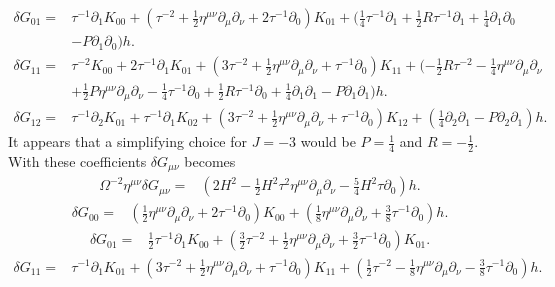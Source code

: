 \documentclass[10pt,letterpaper]{article}
\begin{document}
\begin{align}
\delta G_{01}={}&\tau^{-1} \partial_{1} K_{00}
 + (\tau^{-2}
 + \tfrac{1}{2} \eta^{\mu \nu} \partial_{\mu} \partial_{\nu}
 + 2 \tau^{-1} \partial_{0}) K_{01}
 + (\tfrac{1}{4} \tau^{-1} \partial_{1}
 + \tfrac{1}{2} R \tau^{-1} \partial_{1}
 + \tfrac{1}{4} \partial_{1} \partial_{0}\nonumber\\
& -  P \partial_{1} \partial_{0}) h.
\end{align}
\begin{align}
\delta G_{11}={}&\tau^{-2} K_{00}
 + 2 \tau^{-1} \partial_{1} K_{01}
 + (3 \tau^{-2}
 + \tfrac{1}{2} \eta^{\mu \nu} \partial_{\mu} \partial_{\nu}
 + \tau^{-1} \partial_{0}) K_{11}
 + (- \tfrac{1}{2} R \tau^{-2}
 -  \tfrac{1}{4} \eta^{\mu \nu} \partial_{\mu} \partial_{\nu}\nonumber\\
& + \tfrac{1}{2} P \eta^{\mu \nu} \partial_{\mu} \partial_{\nu}
 -  \tfrac{1}{4} \tau^{-1} \partial_{0}
 + \tfrac{1}{2} R \tau^{-1} \partial_{0}
 + \tfrac{1}{4} \partial_{1} \partial_{1}
 -  P \partial_{1} \partial_{1}) h.
\end{align}
\begin{align}
\delta G_{12}={}&\tau^{-1} \partial_{2} K_{01}
 + \tau^{-1} \partial_{1} K_{02}
 + (3 \tau^{-2}
 + \tfrac{1}{2} \eta^{\mu \nu} \partial_{\mu} \partial_{\nu}
 + \tau^{-1} \partial_{0}) K_{12}
 + (\tfrac{1}{4} \partial_{2} \partial_{1}
 -  P \partial_{2} \partial_{1}) h.
\end{align}
It appears that a simplifying choice for $J=-3$ would be $P=\tfrac14$ and $R=-\tfrac12$. 
With these coefficients $\delta G_{\mu\nu}$ becomes
\begin{align}
\Omega^{-2}\eta^{\mu\nu}\delta G_{\mu\nu}={}&(2 H^2
 -  \tfrac{1}{2} H^2 \tau^2 \eta^{\mu \nu} \partial_{\mu} \partial_{\nu}
 -  \tfrac{5}{4} H^2 \tau \partial_{0}) h.
\end{align}
\begin{align}
\delta G_{00}={}&(\tfrac{1}{2} \eta^{\mu \nu} \partial_{\mu} \partial_{\nu}
 + 2 \tau^{-1} \partial_{0}) K_{00}
 + (\tfrac{1}{8} \eta^{\mu \nu} \partial_{\mu} \partial_{\nu}
 + \tfrac{3}{8} \tau^{-1} \partial_{0}) h.
\end{align}
\begin{align}
\delta G_{01}={}&\tfrac{1}{2} \tau^{-1} \partial_{1} K_{00}
 + (\tfrac{3}{2} \tau^{-2}
 + \tfrac{1}{2} \eta^{\mu \nu} \partial_{\mu} \partial_{\nu}
 + \tfrac{3}{2} \tau^{-1} \partial_{0}) K_{01}.
\end{align}
\begin{align}
\delta G_{11}={}&\tau^{-1} \partial_{1} K_{01}
 + (3 \tau^{-2}
 + \tfrac{1}{2} \eta^{\mu \nu} \partial_{\mu} \partial_{\nu}
 + \tau^{-1} \partial_{0}) K_{11}
 + (\tfrac{1}{2} \tau^{-2}
 -  \tfrac{1}{8} \eta^{\mu \nu} \partial_{\mu} \partial_{\nu}
 -  \tfrac{3}{8} \tau^{-1} \partial_{0}) h.
\end{align}
\end{document}

